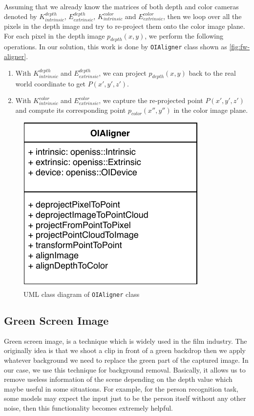 Assuming that we already know the matrices of both depth and color cameras denoted by
$K_{intrinsic}^{depth}$, $E_{extrinsic}^{depth}$, $K_{intrinsic}^{color}$ and
$E_{extrinsic}^{color}$, then we loop over all the pixels in the depth image and
try to re-project them onto the color image plane. For each pixel in the depth
image $p_{depth}(x, y)$, we perform the following operations. In our solution, 
this work is done by \texttt{OIAligner} class shown as
\autoref{fig:fw-aligner}.

\begin{enumerate}
    \item With $K_{intrinsic}^{depth}$ and $E_{extrinsic}^{depth}$, we can
    project $p_{depth}(x, y)$ back to the real world coordinate to get
    $P(x', y', z')$.
    \item With $K_{intrinsic}^{color}$ and $E_{extrinsic}^{color}$, we capture
    the re-projected point $P(x', y', z')$ and compute its corresponding
    point $p_{color}(x'', y'')$ in the color image plane.
\end{enumerate}

\begin{figure}
    \centering
    \includegraphics[scale=1.0]{figures/framework_oialigner.pdf}
    \caption{UML class diagram of {\texttt{OIAligner}} class}
    \label{fig:fw-aligner}
\end{figure}

\subsection{Green Screen Image}
\label{sec:Impl-fw-app-green-img}

Green screen image, is a technique which is widely used in the film industry. 
The originally idea is that we shoot a clip in front of a green backdrop then we
apply whatever background we need to replace the green part of the captured image.
In our case, we use this technique for background removal. Basically, it allows us
to remove useless information of the scene depending on the depth value which
maybe useful in some situations. For example, for the person recognition task,
some models may expect the input just to be the person itself without any
other noise, then this functionality becomes extremely helpful.

